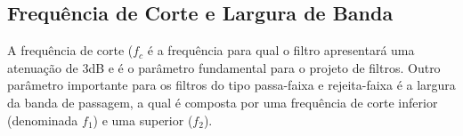 \subsection{Frequência de Corte e Largura de Banda}
A frequência de corte ($f_c$ é a frequência para qual o filtro apresentará uma atenuação de 3dB e é o parâmetro fundamental para o projeto de filtros.
Outro parâmetro importante para os filtros do tipo passa-faixa e rejeita-faixa é a largura da banda de passagem, a qual é composta por uma frequência de corte inferior (denominada $f_1$) e uma superior ($f_2$).